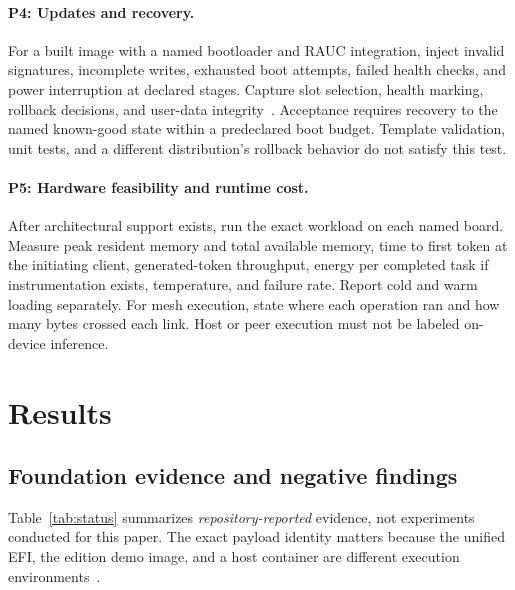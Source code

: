 \documentclass[11pt,a4paper]{article}
\begin{document}
\paragraph{P4: Updates and recovery.}
For a built image with a named bootloader and RAUC integration, inject invalid signatures, incomplete writes, exhausted boot attempts, failed health checks, and power interruption at declared stages. Capture slot selection, health marking, rollback decisions, and user-data integrity~\cite{rauc}. Acceptance requires recovery to the named known-good state within a predeclared boot budget. Template validation, unit tests, and a different distribution's rollback behavior do not satisfy this test.

\paragraph{P5: Hardware feasibility and runtime cost.}
After architectural support exists, run the exact workload on each named board. Measure peak resident memory and total available memory, time to first token at the initiating client, generated-token throughput, energy per completed task if instrumentation exists, temperature, and failure rate. Report cold and warm loading separately. For mesh execution, state where each operation ran and how many bytes crossed each link. Host or peer execution must not be labeled on-device inference.

\section{Results}
\subsection{Foundation evidence and negative findings}
Table~\ref{tab:status} summarizes \emph{repository-reported} evidence, not experiments conducted for this paper. The exact payload identity matters because the unified EFI, the edition demo image, and a host container are different execution environments~\cite{waves,reconcile}.
\end{document}
